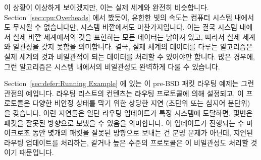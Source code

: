 이 상황이 이상하게 보이겠지만, 이는 실제 세계와 완전히 비슷합니다.
Section~\ref{sec:cpu:Overheads} 에서 봤듯이, 유한한 빛의 속도는 컴퓨터 시스템
내에서도 무시될 수 없습니다만, 시스템 바깥에서도 마찬가지입니다.
이는 결국 시스템 내에서 실제 바깥 세계에서의 것을 표현하는 모든 데이터는 낡아져
있고, 따라서 실제 세계와 일관성을 갖지 못함을 의미합니다.
결국, 실제 세계의 데이터를 다루는 알고리즘은 실제 세계의 것과 비일관적이 되는
데이터를 처리할 수 있어야만 합니다.
많은 경우에, 그런 알고리즘은 시스템 내에서의 비일관성도 완벽하게 다룰 수
있습니다.

Section~\ref{sec:defer:Running Example} 에 있는 이 pre-BSD 패킷 라우팅 예제는
그런 관점의 예입니다.
라우팅 리스트의 컨텐츠는 라우팅 프로토콜에 의해 설정되고, 이 프로토콜은 다양한
비안정 상태를 막기 위한 상당한 지연 (초단위 또는 심지어 분단위) 을 갖습니다.
이런 지연들은 일단 라우팅 업데이트가 특정 시스템에 도달하면, 몇번은 패킷을
잘못된 방향으로 보냈을 수 있음을 의미합니다.
이 업데이트가 진행되는 수 마이크로초 동안 몇개의 패킷을 잘못된 방향으로 보내는
건 분명 문제가 아닌데, 지연된 라우팅 업데이트를 처리하는, 같거나 높은 수준의
프로토콜은 이 비일관성도 처리할 것이기 때문입니다.

